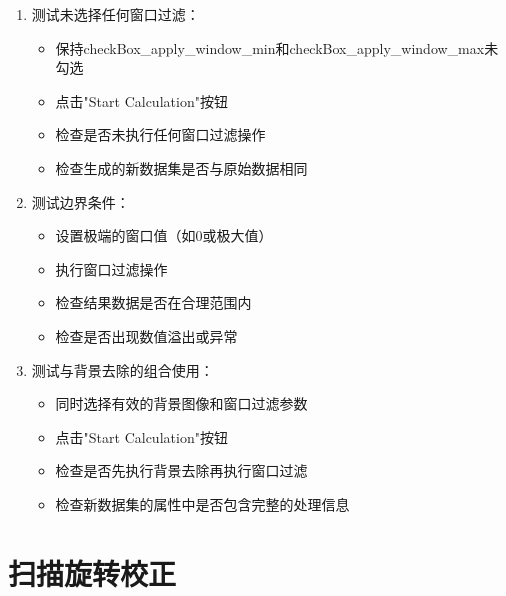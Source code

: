 \documentclass[a4paper,12pt]{report}	%
\begin{document}
\begin{enumerate}
    \item 测试未选择任何窗口过滤：
    \begin{itemize}
        \item 保持checkBox\_apply\_window\_min和checkBox\_apply\_window\_max未勾选
        \item 点击"Start Calculation"按钮
        \item 检查是否未执行任何窗口过滤操作
        \item 检查生成的新数据集是否与原始数据相同
    \end{itemize}

    \item 测试边界条件：
    \begin{itemize}
        \item 设置极端的窗口值（如0或极大值）
        \item 执行窗口过滤操作
        \item 检查结果数据是否在合理范围内
        \item 检查是否出现数值溢出或异常
    \end{itemize}

    \item 测试与背景去除的组合使用：
    \begin{itemize}
        \item 同时选择有效的背景图像和窗口过滤参数
        \item 点击"Start Calculation"按钮
        \item 检查是否先执行背景去除再执行窗口过滤
        \item 检查新数据集的属性中是否包含完整的处理信息
    \end{itemize}
\end{enumerate}


\section{扫描旋转校正}
\end{document}
